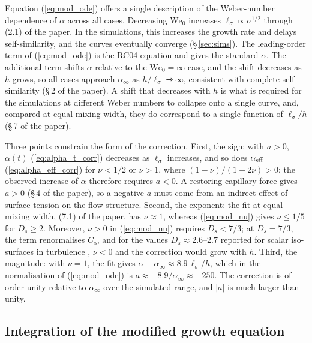 \documentclass[11pt]{article}
\newcommand{\We}{\mathrm{We}_0}
\newcommand{\lls}{\ell_\sigma}
\begin{document}
Equation (\ref{eq:mod_ode}) offers a single description of the Weber-number dependence of $\alpha$ across all cases. Decreasing $\We$ increases $\lls \propto \sigma^{1/2}$ through (2.1) of the paper. In the simulations, this increases the growth rate and delays self-similarity, and the curves eventually converge (\S\,\ref{sec:sims}). The leading-order term of (\ref{eq:mod_ode}) is the RC04 equation and gives the standard $\alpha$. The additional term shifts $\alpha$ relative to the $\We = \infty$ case, and the shift decreases as $h$ grows, so all cases approach $\alpha_\infty$ as $h/\lls \rightarrowtriangle \infty$, consistent with complete self-similarity (\S\,2 of the paper). A shift that decreases with $h$ is what is required for the simulations at different Weber numbers to collapse onto a single curve, and, compared at equal mixing width, they do correspond to a single function of $\lls/h$ (\S\,7 of the paper).

Three points constrain the form of the correction. First, the sign: with $a > 0$, $\alpha(t)$ (\ref{eq:alpha_t_corr}) decreases as $\lls$ increases, and so does $\alpha_{\rm eff}$ (\ref{eq:alpha_eff_corr}) for $\nu < 1/2$ or $\nu > 1$, where $(1 - \nu)/(1 - 2 \nu) > 0$; the observed increase of $\alpha$ therefore requires $a < 0$. A restoring capillary force gives $a > 0$ (\S\,4 of the paper), so a negative $a$ must come from an indirect effect of surface tension on the flow structure. Second, the exponent: the fit at equal mixing width, (7.1) of the paper, has $\nu \approx 1$, whereas (\ref{eq:mod_nu}) gives $\nu \le 1/5$ for $D_s \ge 2$. Moreover, $\nu > 0$ in (\ref{eq:mod_nu}) requires $D_s < 7/3$; at $D_s = 7/3$, the term renormalises $C_\mathrm{o}$, and for the values $D_s \approx 2.6$--$2.7$ reported for scalar iso-surfaces in turbulence \citep{Sreenivasan1991}, $\nu < 0$ and the correction would grow with $h$. Third, the magnitude: with $\nu = 1$, the fit gives $\alpha - \alpha_\infty \approx 8.9 \, \lls/h$, which in the normalisation of (\ref{eq:mod_ode}) is $a \approx -8.9/\alpha_\infty \approx -250$. The correction is of order unity relative to $\alpha_\infty$ over the simulated range, and $| a |$ is much larger than unity.

\subsection{Integration of the modified growth equation}\label{sec:integration}
\end{document}
